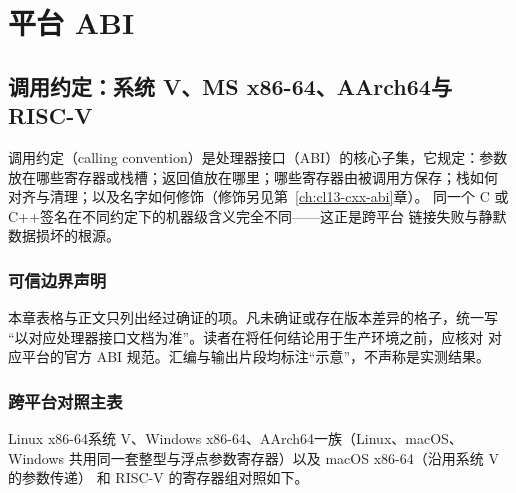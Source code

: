 \documentclass[12pt,a4paper,fontset=fandol]{ctexbook}
\newcommand{\cpp}[1]{C++#1}
\newcommand{\Lang}[1]{\textsf{#1}}
\newcommand{\Nix}{\textsf{Linux}}
\newcommand{\Win}{\textsf{Windows}}
\newcommand{\Mac}{\textsf{macOS}}
\newcommand{\xSixtyFour}{\textsf{x86-64}}
\newcommand{\ArmSixtyFour}{\textsf{AArch64}}
\begin{document}
\part{平台 ABI}
\chapter{调用约定：系统 V、MS \xSixtyFour、\ArmSixtyFour 与 \Lang{RISC-V}}\label{ch:cl10-cc}

\begin{abibox}[title={调用约定定义}]
调用约定（calling convention）是处理器接口（ABI）的核心子集，它规定：参数
放在哪些寄存器或栈槽；返回值放在哪里；哪些寄存器由被调用方保存；栈如何
对齐与清理；以及名字如何修饰（修饰另见第~\ref{ch:cl13-cxx-abi}章）。
同一个 C 或 \cpp 签名在不同约定下的机器级含义完全不同——这正是跨平台
链接失败与静默数据损坏的根源。
\end{abibox}

\section{可信边界声明}\label{sec:cl10-trust}

本章表格与正文只列出经过确证的项。凡未确证或存在版本差异的格子，统一写
``以对应处理器接口文档为准''。读者在将任何结论用于生产环境之前，应核对
对应平台的官方 ABI 规范。汇编与输出片段均标注``示意''，不声称是实测结果。

\section{跨平台对照主表}\label{sec:cl10-main-table}

\Nix{} \xSixtyFour 系统 V、\Win{} \xSixtyFour、\ArmSixtyFour 一族（\Nix、\Mac、\Win
共用同一套整型与浮点参数寄存器）以及 \Mac{} \xSixtyFour（沿用系统 V 的参数传递）
和 \Lang{RISC-V} 的寄存器组对照如下。
\end{document}
